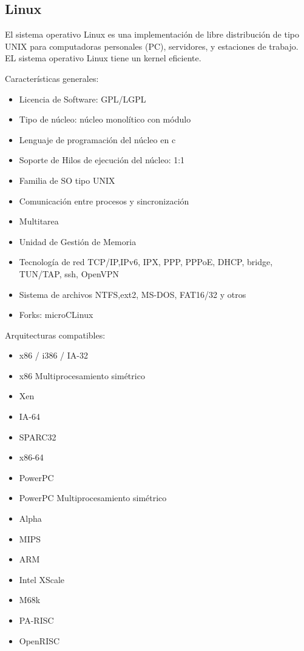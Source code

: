 			 \subsection{Linux}

El sistema operativo Linux es una implementación de libre distribución de tipo UNIX para computadoras personales (PC), servidores, y estaciones de trabajo. EL sistema operativo Linux tiene un kernel eficiente.

 
Características generales:

	\begin{itemize}
	\item Licencia de Software: GPL/LGPL
	\item Tipo de núcleo: núcleo monolítico con módulo
	\item Lenguaje de programación del núcleo en c
	\item Soporte de Hilos de ejecución del núcleo: 1:1
	\item Familia de SO tipo UNIX
	\item Comunicación entre procesos y sincronización
	\item Multitarea
	\item Unidad de Gestión de Memoria 
	\item Tecnología de red TCP/IP,IPv6, IPX, PPP, PPPoE, DHCP, bridge, TUN/TAP, ssh, OpenVPN 	
	\item Sistema de archivos NTFS,ext2, MS-DOS, FAT16/32 y otros
	\item Forks: microCLinux	
	
\end{itemize}			

Arquitecturas compatibles:

				\begin{itemize}
				\item x86 / i386 / IA-32
				\item x86 Multiprocesamiento simétrico
				\item Xen
				\item IA-64 	
				\item SPARC32
				\item x86-64
				\item PowerPC
				\item PowerPC Multiprocesamiento simétrico
				\item Alpha
				\item MIPS
				\item ARM
				\item Intel XScale
				\item M68k
				\item PA-RISC
				\item OpenRISC
			\end{itemize}			


